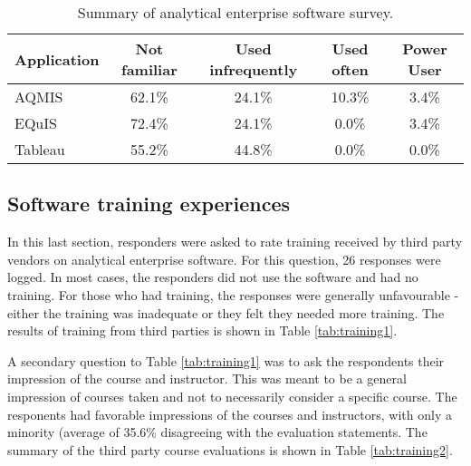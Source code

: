 \begin{table}[!htpb]
\centering
\caption{Summary of analytical enterprise software survey.}
\label{tab:enterprisesumm}
\begin{tabular}{@{}lcccc@{}}
\toprule
\textbf{Application} & \textbf{Not familiar} & \textbf{Used infrequently} & \textbf{Used often} & \textbf{Power User} \\ \midrule
AQMIS & 62.1\% & 24.1\% & 10.3\% & 3.4\% \\
EQuIS & 72.4\% & 24.1\% & 0.0\% & 3.4\% \\
Tableau & 55.2\% & 44.8\% & 0.0\% & 0.0\% \\ \bottomrule
\end{tabular}
\end{table}

\subsection{Software training experiences}
In this last section, responders were asked to rate training received by third party vendors on analytical enterprise software. For this question, 26 responses were logged. In most cases, the responders did not use the software and had no training. For those who had training, the responses were generally unfavourable - either the training was inadequate or they felt they needed more training. The results of training from third parties is shown in Table \ref{tab:training1}.

\begin{table}[!htpb]
\centering
\caption{Results of training from third parties on analytical enterprise software.}
\label{tab:training1}
\end{table}

A secondary question to Table \ref{tab:training1} was to ask the respondents their impression of the course and instructor. This was meant to be a general impression of courses taken and not to necessarily consider a specific course. The responents had favorable impressions of the courses and instructors, with only a minority (average of 35.6\% disagreeing with the evaluation statements. The summary of the third party course evaluations is shown in Table \ref{tab:training2}.

